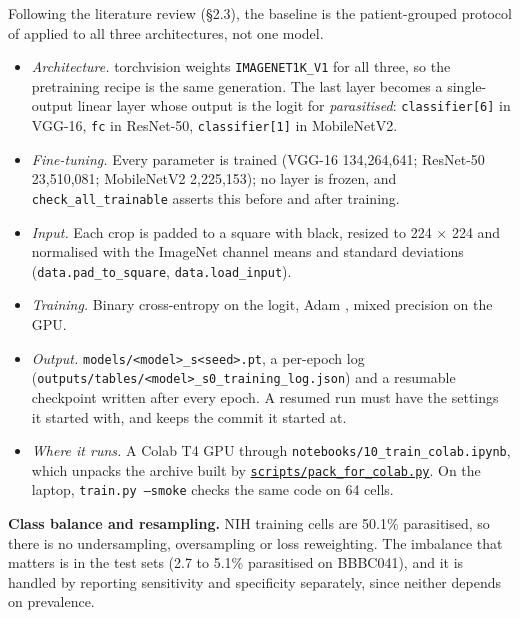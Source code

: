 \documentclass[11pt,a4paper]{article}
\begin{document}
Following the literature review (\S{}2.3), the baseline is the patient-grouped protocol of \citet{hou2026} applied to all three architectures, not one model.

\begin{itemize}
\item \emph{Architecture.} torchvision weights \texttt{IMAGENET1K\_\allowbreak{}V1} for all three, so the pretraining recipe is the same generation. The last layer becomes a single-output linear layer whose output is the logit for \emph{parasitised}: \texttt{classifier[6]} in VGG-16, \texttt{fc} in ResNet-50, \texttt{classifier[1]} in \mbox{MobileNetV2}.
\item \emph{Fine-tuning.} Every parameter is trained (VGG-16 134,264,641; ResNet-50 23,510,081; \mbox{MobileNetV2} 2,225,153); no layer is frozen, and \texttt{check\_\allowbreak{}all\_\allowbreak{}trainable} asserts this before and after training.
\item \emph{Input.} Each crop is padded to a square with black, resized to 224 $\times$ 224 and normalised with the ImageNet channel means and standard deviations (\texttt{data.\allowbreak{}pad\_\allowbreak{}to\_\allowbreak{}square}, \texttt{data.\allowbreak{}load\_\allowbreak{}input}).
\item \emph{Training.} Binary cross-entropy on the logit, Adam \citep{kingma2015}, mixed precision on the GPU.
\item \emph{Output.} \texttt{models/\allowbreak{}<model>\_\allowbreak{}s<seed>.\allowbreak{}pt}, a per-epoch log (\texttt{outputs/\allowbreak{}tables/\allowbreak{}<model>\_\allowbreak{}s0\_\allowbreak{}training\_\allowbreak{}log.\allowbreak{}json}) and a resumable checkpoint written after every epoch. A resumed run must have the settings it started with, and keeps the commit it started at.
\item \emph{Where it runs.} A Colab T4 GPU through \texttt{notebooks/\allowbreak{}10\_\allowbreak{}train\_\allowbreak{}colab.\allowbreak{}ipynb}, which unpacks the archive built by \href{https://gitlab.uvt.nl/capstone/2026-fall/u927271/-/blob/v1.0-final/scripts/pack_for_colab.py}{\texttt{scripts/\allowbreak{}pack\_\allowbreak{}for\_\allowbreak{}colab.\allowbreak{}py}}. On the laptop, \texttt{train.\allowbreak{}py --smoke} checks the same code on 64 cells.
\end{itemize}

\textbf{Class balance and resampling.} NIH training cells are 50.1\% parasitised, so there is no undersampling, oversampling or loss reweighting. The imbalance that matters is in the test sets (2.7 to 5.1\% parasitised on BBBC041), and it is handled by reporting sensitivity and specificity separately, since neither depends on prevalence.
\end{document}
